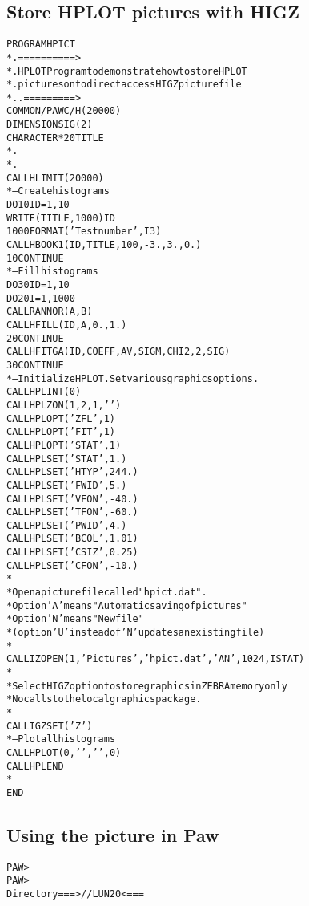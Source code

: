 \begin{figure}
\begin{minipage}[t]{.49\textwidth}
\subsection*{Store HPLOT pictures with HIGZ}
\begin{alltt}
\tiny      PROGRAM HPICT
*.==========>
*.  HPLOT Program to demonstrate how to store HPLOT
*.  pictures onto direct access HIGZ picture file
*..=========>
      COMMON/PAWC/H(20000)
      DIMENSION SIG(2)
      CHARACTER*20 TITLE
*.___________________________________________
*.
      CALL HLIMIT(20000)
* --        Create histograms
      DO 10 ID=1,10
         WRITE(TITLE,1000)ID
 1000    FORMAT('Test number',I3)
         CALL HBOOK1(ID,TITLE,100,-3.,3.,0.)
  10  CONTINUE
* --        Fill histograms
      DO 30 ID=1,10
         DO 20 I=1,1000
            CALL RANNOR(A,B)
            CALL HFILL(ID,A,0.,1.)
  20     CONTINUE
         CALL HFITGA(ID,COEFF,AV,SIGM,CHI2,2,SIG)
  30  CONTINUE
* --       Initialize HPLOT. Set various graphics options.
      CALL HPLINT(0)
      CALL HPLZON(1,2,1,' ')
      CALL HPLOPT('ZFL',1)
      CALL HPLOPT('FIT',1)
      CALL HPLOPT('STAT',1)
      CALL HPLSET('STAT',1.)
      CALL HPLSET('HTYP',244.)
      CALL HPLSET('FWID',5.)
      CALL HPLSET('VFON',-40.)
      CALL HPLSET('TFON',-60.)
      CALL HPLSET('PWID',4.)
      CALL HPLSET('BCOL',1.01)
      CALL HPLSET('CSIZ',0.25)
      CALL HPLSET('CFON',-10.)
*
*   Open a picture file called "hpict.dat".
*   Option 'A' means "Automatic saving of pictures"
*   Option 'N' means "New file"
*   (option 'U' instead of 'N' updates an existing file)
*
      CALL IZOPEN(1,'Pictures','hpict.dat','AN',1024,ISTAT)
*
*   Select HIGZ option to store graphics in ZEBRA memory only
*   No calls to the local graphics package.
*
      CALL IGZSET('Z')
* --      Plot all histograms
      CALL HPLOT(0,' ',' ',0)
      CALL HPLEND
*
      END
\end{alltt}
\end{minipage} \hfill
\begin{minipage}[t]{.49\textwidth}
\subsection*{Using the picture in Paw}
\begin{alltt}\scriptsize
PAW > 
PAW > 
            Directory ===> //LUN20 <===
 

\end{alltt}
\end{minipage}
\end{figure}
